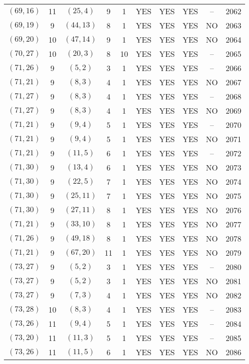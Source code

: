 \begin{longtable}{|c|c|c|c|c|c|c|c|c|c|}
$(69, 16)$ & 11 & $(25, 4)$ & 9 & 1 & YES & YES & YES & -- & 2062\\
$(69, 19)$ & 9 & $(44, 13)$ & 8 & 1 & YES & YES & YES & NO & 2063\\
$(69, 20)$ & 10 & $(47, 14)$ & 9 & 1 & YES & YES & YES & NO & 2064\\
$(70, 27)$ & 10 & $(20, 3)$ & 8 & 10 & YES & YES & YES & -- & 2065\\
$(71, 26)$ & 9 & $(5, 2)$ & 3 & 1 & YES & YES & YES & -- & 2066\\
$(71, 21)$ & 9 & $(8, 3)$ & 4 & 1 & YES & YES & YES & NO & 2067\\
$(71, 27)$ & 9 & $(8, 3)$ & 4 & 1 & YES & YES & YES & -- & 2068\\
$(71, 27)$ & 9 & $(8, 3)$ & 4 & 1 & YES & YES & YES & NO & 2069\\
$(71, 21)$ & 9 & $(9, 4)$ & 5 & 1 & YES & YES & YES & -- & 2070\\
$(71, 21)$ & 9 & $(9, 4)$ & 5 & 1 & YES & YES & YES & NO & 2071\\
$(71, 21)$ & 9 & $(11, 5)$ & 6 & 1 & YES & YES & YES & -- & 2072\\
$(71, 30)$ & 9 & $(13, 4)$ & 6 & 1 & YES & YES & YES & NO & 2073\\
$(71, 30)$ & 9 & $(22, 5)$ & 7 & 1 & YES & YES & YES & NO & 2074\\
$(71, 30)$ & 9 & $(25, 11)$ & 7 & 1 & YES & YES & YES & NO & 2075\\
$(71, 30)$ & 9 & $(27, 11)$ & 8 & 1 & YES & YES & YES & NO & 2076\\
$(71, 21)$ & 9 & $(33, 10)$ & 8 & 1 & YES & YES & YES & NO & 2077\\
$(71, 26)$ & 9 & $(49, 18)$ & 8 & 1 & YES & YES & YES & NO & 2078\\
$(71, 21)$ & 9 & $(67, 20)$ & 11 & 1 & YES & YES & YES & NO & 2079\\
$(73, 27)$ & 9 & $(5, 2)$ & 3 & 1 & YES & YES & YES & -- & 2080\\
$(73, 27)$ & 9 & $(5, 2)$ & 3 & 1 & YES & YES & YES & NO & 2081\\
$(73, 27)$ & 9 & $(7, 3)$ & 4 & 1 & YES & YES & YES & NO & 2082\\
$(73, 28)$ & 10 & $(8, 3)$ & 4 & 1 & YES & YES & YES & -- & 2083\\
$(73, 26)$ & 11 & $(9, 4)$ & 5 & 1 & YES & YES & YES & -- & 2084\\
$(73, 20)$ & 11 & $(11, 3)$ & 5 & 1 & YES & YES & YES & -- & 2085\\
$(73, 26)$ & 11 & $(11, 5)$ & 6 & 1 & YES & YES & YES & NO & 2086\\

\end{longtable}
